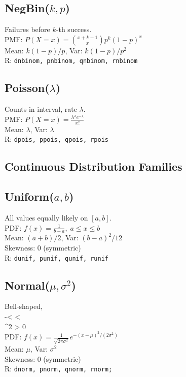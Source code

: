 \documentclass[7pt,landscape]{article}
\begin{document}
\begin{multicols}{3}
\subsection*{NegBin($k,p$)}
Failures before $k$-th success. \\
PMF: $P(X=x)=\binom{x+k-1}{x}p^k(1-p)^x$ \\
Mean: $k(1-p)/p$, Var: $k(1-p)/p^2$ \\
R: \texttt{dnbinom, pnbinom, qnbinom, rnbinom}

\subsection*{Poisson($\lambda$)}
Counts in interval, rate $\lambda$. \\
PMF: $P(X=x)=\tfrac{\lambda^x e^{-\lambda}}{x!}$ \\
Mean: $\lambda$, Var: $\lambda$ \\
R: \texttt{dpois, ppois, qpois, rpois}

\subsection*{Continuous Distribution Families}

\subsection*{Uniform($a,b$)}
All values equally likely on $[a,b]$. \\
PDF: $f(x)=\tfrac{1}{b-a}, \; a \le x \le b$ \\
Mean: $(a+b)/2$, Var: $(b-a)^2/12$ \\
Skewness: 0 (symmetric) \\
R: \texttt{dunif, punif, qunif, runif} \\

\subsection*{Normal($\mu,\sigma^2$)}
Bell-shaped, \\ 
-\infty < \mu < \infty \\
\sigma^2 > 0 \\
PDF: $f(x)=\tfrac{1}{\sqrt{2\pi\sigma^2}} e^{-(x-\mu)^2/(2\sigma^2)}$ \\
Mean: $\mu$, Var: $\sigma^2$ \\
Skewness: 0 (symmetric) \\
R: \texttt{dnorm, pnorm, qnorm, rnorm;} \\


\end{multicols}
\end{document}
